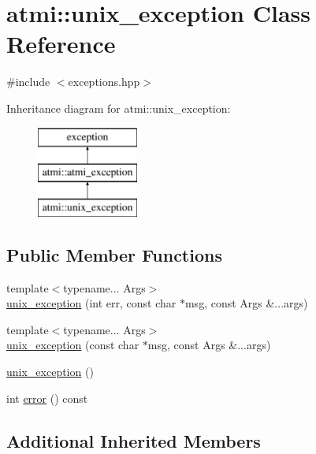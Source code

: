 \hypertarget{classatmi_1_1unix__exception}{\section{atmi\+:\+:unix\+\_\+exception Class Reference}
\label{classatmi_1_1unix__exception}
}


{\ttfamily \#include $<$exceptions.\+hpp$>$}

Inheritance diagram for atmi\+:\+:unix\+\_\+exception\+:\begin{figure}[H]
\begin{center}
\leavevmode
\includegraphics[height=3.000000cm]{classatmi_1_1unix__exception}
\end{center}
\end{figure}
\subsection*{Public Member Functions}
\begin{DoxyCompactItemize}
\item 
{\footnotesize template$<$typename... Args$>$ }\\\hyperlink{classatmi_1_1unix__exception_a0e296d42c4d9e4008e0f3b920fe453ae}{unix\+\_\+exception} (int err, const char $\ast$msg, const Args \&...args)
\item 
{\footnotesize template$<$typename... Args$>$ }\\\hyperlink{classatmi_1_1unix__exception_aec5e09afab40d70b2b4d9aa314a5b71b}{unix\+\_\+exception} (const char $\ast$msg, const Args \&...args)
\item 
\hyperlink{classatmi_1_1unix__exception_aeba0ddfd609e50f3bdf03b7208fdcc3d}{unix\+\_\+exception} ()
\item 
int \hyperlink{classatmi_1_1unix__exception_a4aab55cca505c04ea9e1c65b8cc0c254}{error} () const 
\end{DoxyCompactItemize}
\subsection*{Additional Inherited Members}


